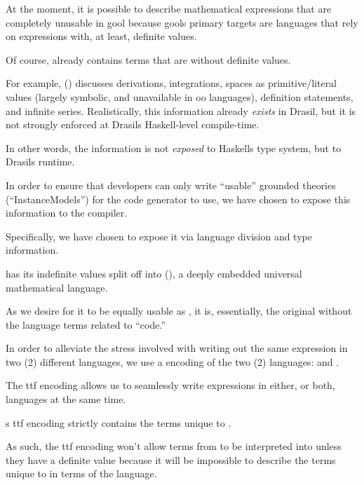 At the moment, it is possible to describe mathematical expressions that are
completely unusable in \acs{gool} because \acsp{gool} primary targets are
languages that rely on expressions with, at least, definite values.

Of course, \Expr{} already contains terms that are without definite values.

For example, \Expr{} () discusses derivations,
integrations, spaces as primitive/literal values (largely symbolic, and
unavailable in \acs{oo} languages), definition statements, and infinite series.
Realistically, this information already \textit{exists} in Drasil, but it is not
strongly enforced at Drasils Haskell-level compile-time.

In other words, the information is not \textit{exposed} to Haskells type system,
but to Drasils runtime.




In order to ensure that developers can only write ``usable'' grounded theories
(``InstanceModels'') for the code generator to use, we have chosen to expose
this information to the compiler.

Specifically, we have chosen to expose it via language division and type
information.

\languageDivision{}

\Expr{} has its indefinite values split off into \ModelExpr{}
(), a deeply embedded universal mathematical
language.

As we desire for it to be equally usable as \Expr{}, it is, essentially, the
original \Expr{} without the language terms related to ``code.''

In order to alleviate the stress involved with writing out the same expression
in two (2) different languages, we use a  encoding of the two (2)
languages:  and . 

The \acs{ttf} encoding allows us to seamlessly write expressions in either, or
both, languages at the same time. 

\ModelExpr{}s \acs{ttf} encoding strictly contains the terms unique to
\ModelExpr{}.

As such, the \acs{ttf} encoding won't allow terms from \ModelExpr{} to be
interpreted into \Expr{} unless they have a definite value because it will be
impossible to describe the terms unique to \ModelExpr{} in terms of the \Expr{}
language.

